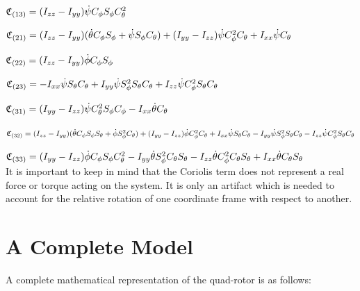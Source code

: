 $\mathfrak{C}_{(13)} = (I_{zz}-I_{yy})    \dot{\psi}   C_{\phi}   S_{\phi}  C_{\theta}^2$


$\mathfrak{C}_{(21)} = (I_{zz}-I_{yy})   ( \dot{\theta} C_{\phi} S_{\phi} +  \dot{\psi} S_{\phi} C_{\theta} ) + (I_{yy}-I_{zz})    \dot{\psi}   C_{\phi}^2  C_{\theta} + I_{xx}    \dot{\psi}   C_{\theta}$


$\mathfrak{C}_{(22)}  = (I_{zz}-I_{yy}) \dot{\phi} C_{\phi} S_{\phi}$


$\mathfrak{C}_{(23)}  = -I_{xx}  \dot{\psi} S_{\theta} C_{\theta} + I_{yy}  \dot{\psi} S_{\phi}^2 S_{\theta} C_{\theta} + I_{zz} \dot{\psi} C_{\phi}^2 S_{\theta} C_{\theta}$


$\mathfrak{C}_{(31)} = (I_{yy}-I_{zz}) \dot{\psi} C_{\theta}^2 S_{\phi} C_{\phi} - I_{xx} \dot{\theta} C_{\theta}$


$\mathfrak{C}_{(32)}  = (I_{zz}-I_{yy}) ( \dot{\theta} C_{\phi} S_{\phi} S_{\theta} + \dot{\phi} S_{\phi}^2 C_{\theta} ) + (I_{yy}-I_{zz}) \dot{\phi} C_{\phi}^2 C_{\theta} + I_{xx}  \dot{\psi} S_{\theta} C_{\theta} - I_{yy}  \dot{\psi} S_{\phi}^2 S_{\theta} C_{\theta} - I_{zz}  \dot{\psi} C_{\phi}^2 S_{\theta} C_{\theta}$


$\mathfrak{C}_{(33)} = (I_{yy}-I_{zz})   \dot{\phi}  C_{\phi} S_{\phi} C_{\theta}^2 - I_{yy}   \dot{\theta} S_{\phi}^2 C_{\theta} S_{\theta} - I_{zz} \dot{\theta} C_{\phi}^2 C_{\theta} S_{\theta} + I_{xx} \dot{\theta} C_{\theta} S_{\theta}$\\




 It is important to keep in mind that the Coriolis term does not represent a real force or torque acting on the system. It is only an artifact which is needed to account for the relative rotation of one coordinate frame with respect to another.






\section {A Complete Model}


A complete mathematical representation of the quad-rotor is as follows:\\

